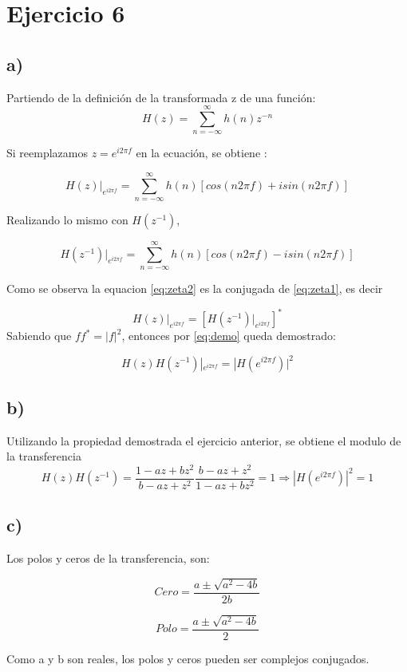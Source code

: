 \documentclass[../../guia1.tex]{subfiles}
\begin{document}
\section*{Ejercicio 6}
\subsection*{a)}
Partiendo de la definición de la transformada z de una función:
\begin{equation}
H(z)=\sum_{n=-\infty}^{\infty} h(n) z^{-n}
\end{equation}

Si reemplazamos $z=e^{i2\pi f}$ en la ecuación, se obtiene :

\begin{equation}
H(z)|_{e^{i2\pi f}} = \sum_{n=-\infty}^{\infty} h(n)\left[ cos(n2\pi f) + i sin(n2\pi f) \right] \label{eq:zeta1}
\end{equation}

Realizando lo mismo con $H(z^{-1})$,

\begin{equation}
H(z^{-1})|_{e^{i2\pi f}} = \sum_{n=-\infty}^{\infty}h(n) \left[ cos(n2\pi f) - i sin(n2\pi f) \right] \label{eq:zeta2}
\end{equation}

Como se observa la equacion \ref{eq:zeta2} es la conjugada de \ref{eq:zeta1}, es decir

\begin{equation}
H(z)|_{e^{i2\pi f}} = \left[ H(z^{-1})|_{e^{i2\pi f}} \right]^* \label{eq:demo}
\end{equation}
Sabiendo que $f f^* =|f|^2 $, entonces por \ref{eq:demo} queda demostrado:

\begin{equation}
H(z)H(z^{-1})|_{e^{i2\pi f}}=|H(e^{i2\pi f})|^2
\end{equation}

\subsection*{b)}
Utilizando la propiedad demostrada el ejercicio anterior, se obtiene el modulo de la transferencia
\begin{equation}
H(z)H(z^{-1})=\frac{1 - a z + b z^2}{b - az + z^2} \frac{b - az + z^2}{1 - a z + b z^2} = 1 \Rightarrow |H(e^{i2\pi f})|^2 =1
\end{equation}


\subsection*{c)}
Los polos y ceros de la transferencia, son:

\begin{equation}
Cero=\frac{a \pm \sqrt{a^2-4b}}{2b}
\end{equation}

\begin{equation}
Polo=\frac{a \pm \sqrt{a^2-4b}}{2}
\end{equation}

Como a y b son reales, los polos y ceros pueden ser complejos conjugados.
\end{document}
